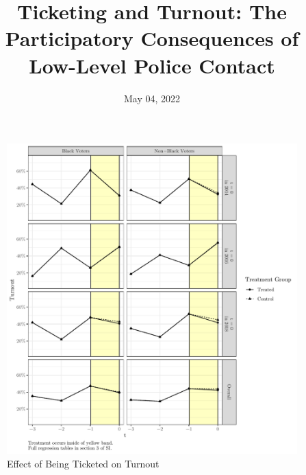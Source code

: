 \documentclass[
  12pt,
]{article}
\title{Ticketing and Turnout: The Participatory Consequences of Low-Level Police Contact}
\author{}
\date{\vspace{-2.5em}May 04, 2022}
\begin{document}
\maketitle

\pagebreak

\doublespacing

\begin{figure}[H]

{\centering \includegraphics{compile_files/figure-latex/did-primary-1} 

}

\caption{\label{fig:did-1}Effect of Being Ticketed on Turnout}\label{fig:did-primary}
\end{figure}
\end{document}
